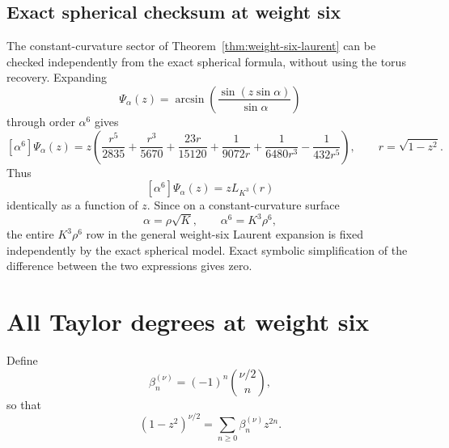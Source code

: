 \documentclass[11pt]{article}
\theoremstyle{definition}
\theoremstyle{remark}
\begin{document}
\subsection{Exact spherical checksum at weight six}

The constant-curvature sector of Theorem~\ref{thm:weight-six-laurent} can be
checked independently from the exact spherical formula, without using the
torus recovery.  Expanding
\[
\Psi_\alpha(z)
=
\arcsin\!\left(
\frac{\sin(z\sin\alpha)}{\sin\alpha}
\right)
\]
through order \(\alpha^6\) gives
\[
\boxed{
[\alpha^6]\Psi_\alpha(z)
=
z\left(
\frac{r^5}{2835}
+\frac{r^3}{5670}
+\frac{23r}{15120}
+\frac{1}{9072r}
+\frac{1}{6480r^3}
-\frac{1}{432r^5}
\right),
}
\qquad r=\sqrt{1-z^2}.
\]
Thus
\[
[\alpha^6]\Psi_\alpha(z)=zL_{K^3}(r)
\]
identically as a function of \(z\).  Since on a constant-curvature surface
\[
\alpha=\rho\sqrt K,
\qquad
\alpha^6=K^3\rho^6,
\]
the entire \(K^3\rho^6\) row in the general weight-six Laurent expansion is
fixed independently by the exact spherical model.  Exact symbolic
simplification of the difference between the two expressions gives zero.

\section{All Taylor degrees at weight six}
\label{sec:all-n}

Define
\[
\boxed{
\beta_n^{(\nu)}=(-1)^n\binom{\nu/2}{n},
}
\]
so that
\[
(1-z^2)^{\nu/2}
=
\sum_{n\ge0}\beta_n^{(\nu)}z^{2n}.
\]
\end{document}

